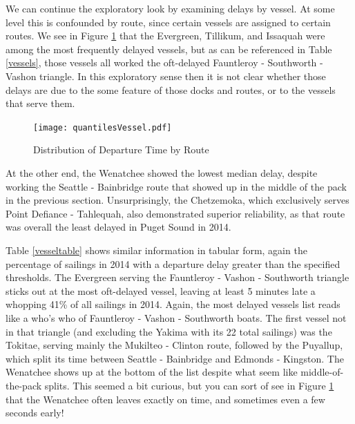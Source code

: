 \documentclass[11pt, letterpaper]{article}
\begin{document}
We can continue the exploratory look by examining delays by vessel. At some level this is confounded by route, since certain vessels are assigned to certain routes. We see in Figure \ref{vessel1} that the Evergreen, Tillikum, and Issaquah were among the most frequently delayed vessels, but as can be referenced in Table \ref{vessels}, those vessels all worked the oft-delayed Fauntleroy - Southworth - Vashon triangle. In this exploratory sense then it is not clear whether those delays are due to the some feature of those docks and routes, or to the vessels that serve them.

\begin{figure}[htbp]
\begin{center}
\texttt{[image: quantilesVessel.pdf]}
\caption{Distribution of Departure Time by Route}
\label{vessel1}
\end{center}
\end{figure}

At the other end, the Wenatchee showed the lowest median delay, despite working the Seattle - Bainbridge route that showed up in the middle of the pack in the previous section. Unsurprisingly, the Chetzemoka, which exclusively serves Point Defiance - Tahlequah, also demonstrated superior reliability, as that route was overall the least delayed in Puget Sound in 2014.

Table \ref{vesseltable} shows similar information in tabular form, again the percentage of sailings in 2014 with a departure delay greater than the specified thresholds.  The Evergreen serving the Fauntleroy - Vashon - Southworth triangle sticks out at the most oft-delayed vessel, leaving at least 5 minutes late a whopping 41\% of all sailings in 2014. Again, the most delayed vessels list reads like a who's who of Fauntleroy - Vashon - Southworth boats. The first vessel not in that triangle (and excluding the Yakima with its 22 total sailings) was the Tokitae, serving mainly the Mukilteo - Clinton route, followed by the Puyallup, which split its time between Seattle - Bainbridge and Edmonds - Kingston. The Wenatchee shows up at the bottom of the list despite what seem like middle-of-the-pack splits. This seemed a bit curious, but you can sort of see in Figure \ref{vessel1} that the Wenatchee often leaves exactly on time, and sometimes even a few seconds early!
\end{document}
